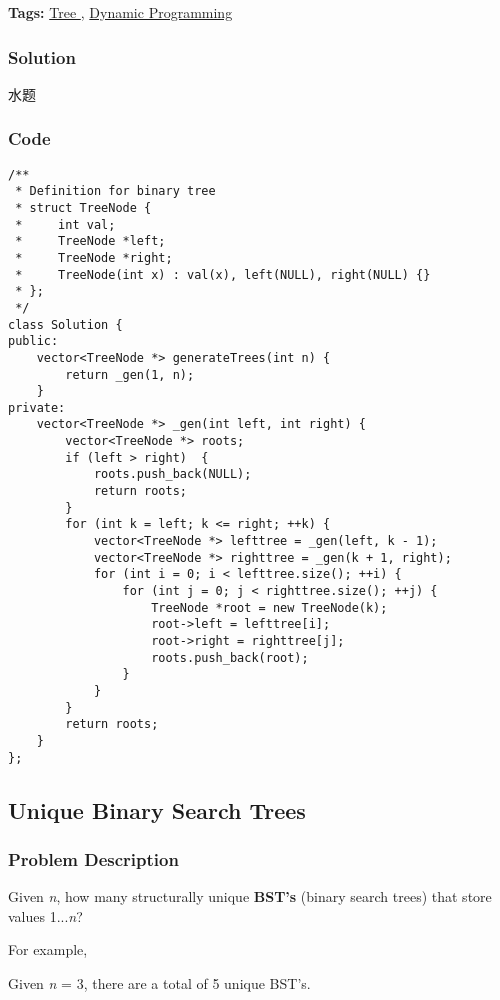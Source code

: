 \documentclass{article}
\begin{document}
\begin{CJK*}{UTF8}{gkai}
\textbf{Tags: }
\hyperref[ Tree ]{ Tree },  \hyperref[ Dynamic Programming ]{ Dynamic Programming }



\subsubsection*{Solution}
水题

\subsubsection*{Code}
\begin{lstlisting}
/**
 * Definition for binary tree
 * struct TreeNode {
 *     int val;
 *     TreeNode *left;
 *     TreeNode *right;
 *     TreeNode(int x) : val(x), left(NULL), right(NULL) {}
 * };
 */
class Solution {
public:
    vector<TreeNode *> generateTrees(int n) {
        return _gen(1, n);
    }
private:
    vector<TreeNode *> _gen(int left, int right) {
        vector<TreeNode *> roots;
        if (left > right)  {
            roots.push_back(NULL);
            return roots;
        }
        for (int k = left; k <= right; ++k) {
            vector<TreeNode *> lefttree = _gen(left, k - 1);
            vector<TreeNode *> righttree = _gen(k + 1, right);
            for (int i = 0; i < lefttree.size(); ++i) {
                for (int j = 0; j < righttree.size(); ++j) {
                    TreeNode *root = new TreeNode(k);
                    root->left = lefttree[i];
                    root->right = righttree[j];
                    roots.push_back(root);
                }
            }
        }
        return roots;
    }
}; 
\end{lstlisting}


\subsection{ Unique Binary Search Trees }
\label{ Unique Binary Search Trees }

\subsubsection*{Problem Description}
Given \emph{n}, how many structurally unique \textbf{BST's} (binary search trees) that store values 1...\emph{n}?

For example,


Given \emph{n} = 3, there are a total of 5 unique BST's.


\end{CJK*}
\end{document}
